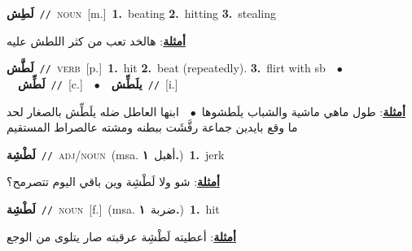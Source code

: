 \documentclass[10pt,a4paper,twoside]{article} %
\begin{document}
\begin{multicols}{2}
{\setlength\topsep{0pt}\textbf{\foreignlanguage{arabic}{لَطِش}}\ {\color{gray}\texttt{//}\color{black}}\ \textsc{noun}\ [m.]\ \textbf{1.}~beating  \textbf{2.}~hitting  \textbf{3.}~stealing\  \begin{flushright}\color{gray}\foreignlanguage{arabic}{\textbf{\underline{\foreignlanguage{arabic}{أمثلة}}}: هالخد تعب من كثر اللطش عليه}\end{flushright}\color{black}} \vspace{2mm}

{\setlength\topsep{0pt}\textbf{\foreignlanguage{arabic}{لَطَّش}}\ {\color{gray}\texttt{//}\color{black}}\ \textsc{verb}\ [p.]\ \textbf{1.}~hit  \textbf{2.}~beat (repeatedly).  \textbf{3.}~flirt with sb\ \ $\bullet$\ \ \setlength\topsep{0pt}\textbf{\foreignlanguage{arabic}{لَطِّش}}\ {\color{gray}\texttt{//}\color{black}}\ [c.]\ \ $\bullet$\ \ \setlength\topsep{0pt}\textbf{\foreignlanguage{arabic}{يلَطِّش}}\ {\color{gray}\texttt{//}\color{black}}\ [i.]\  \begin{flushright}\color{gray}\foreignlanguage{arabic}{\textbf{\underline{\foreignlanguage{arabic}{أمثلة}}}: طول ماهي ماشية والشباب يلَطشوها\ $\bullet$\ \  ابنها العاطل ضله يلَطِّش بالصغار لحد ما وقع بايدين جماعة رفَّشَت ببطنه ومشته عالصراط المستقيم}\end{flushright}\color{black}} \vspace{2mm}

{\setlength\topsep{0pt}\textbf{\foreignlanguage{arabic}{لَطْشِة}}\ {\color{gray}\texttt{//}\color{black}}\ \textsc{adj/noun}\ \color{gray}(msa. \foreignlanguage{arabic}{أهبل}~\foreignlanguage{arabic}{\textbf{١.}})\color{black}\ \textbf{1.}~jerk\  \begin{flushright}\color{gray}\foreignlanguage{arabic}{\textbf{\underline{\foreignlanguage{arabic}{أمثلة}}}: شو ولا لَطْشِة وين باقي اليوم تتصرمح؟}\end{flushright}\color{black}} \vspace{2mm}

{\setlength\topsep{0pt}\textbf{\foreignlanguage{arabic}{لَطْشِة}}\ {\color{gray}\texttt{//}\color{black}}\ \textsc{noun}\ [f.]\ \color{gray}(msa. \foreignlanguage{arabic}{ضربة}~\foreignlanguage{arabic}{\textbf{١.}})\color{black}\ \textbf{1.}~hit\  \begin{flushright}\color{gray}\foreignlanguage{arabic}{\textbf{\underline{\foreignlanguage{arabic}{أمثلة}}}: أعطيته لَطْشِة عرقبته صار يتلوى من الوجع}\end{flushright}\color{black}} \vspace{2mm}


\end{multicols}
\end{document}
